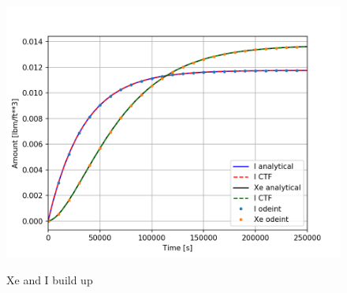\begin{figure}[ht]
  \centering
  \includegraphics[width=5in]{images/XeIBuildup.png}\\
  \caption{Xe and I build up}
  \label{fig:Xe_I_buildup_source_problem}
\end{figure}

